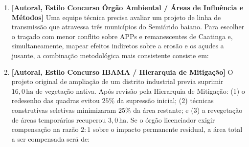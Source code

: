 \begin{enumerate}[leftmargin=1.8em, itemsep=6pt]
  \item \textbf{[Autoral, Estilo Concurso Órgão Ambiental / Áreas de Influência e Métodos]} Uma equipe técnica precisa avaliar um projeto de linha de transmissão que atravessa três municípios do Semiárido baiano. Para escolher o traçado com menor conflito sobre APPs e remanescentes de Caatinga e, simultaneamente, mapear efeitos indiretos sobre a erosão e os açudes a jusante, a combinação metodológica mais consistente consiste em:
  \espacoResolucao[1.1cm]

  \item \textbf{[Autoral, Estilo Concurso IBAMA / Hierarquia de Mitigação]} O projeto original de ampliação de um distrito industrial previa suprimir $16{,}0\,\text{ha}$ de vegetação nativa. Após revisão pela Hierarquia de Mitigação: (1) o redesenho das quadras evitou $25\%$ da supressão inicial; (2) técnicas construtivas seletivas minimizaram $25\%$ da área restante; e (3) a revegetação de áreas temporárias recuperou $3{,}0\,\text{ha}$. Se o órgão licenciador exigir compensação na razão $2:1$ sobre o impacto permanente residual, a área total a ser compensada será de:
  \espacoResolucao[1.4cm]


\end{enumerate}
